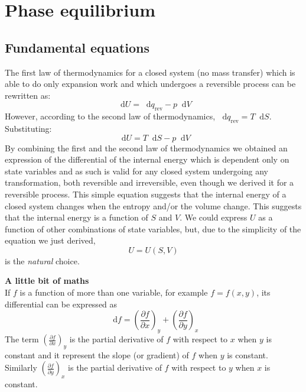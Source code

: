 \documentclass[12pt,a4paper]{report}
\newcommand*\diff{\mathop{}\!\mathrm{d}}
\begin{document}
   \pagestyle{headings}
   \thispagestyle{plain}
   \newpage
   \noindent
   \begin{center}
   \end{center}
   \section*{Phase equilibrium}
   \subsection*{Fundamental equations}
   The first law of thermodynamics for a closed system (no mass transfer) which is able to do only expansion work and which undergoes a reversible process can be rewritten as:
   \begin{equation*}
   \diff U = \diff q_{\mathrm{rev}} -p \diff V
   \end{equation*}
   However, according to the second law of thermodynamics, $\diff q_{\mathrm{rev}}=T\diff S$. Substituting: 
   \begin{equation*}
   \diff U = T\diff S-p \diff V
   \end{equation*}
   By combining the first and the second law of thermodynamics we obtained an expression of the differential of the internal energy which is dependent only on state variables and as such is valid for any closed system undergoing any transformation, both reversible and irreversible, even though we derived it for a reversible process. This simple equation suggests that the internal energy of a closed system changes when the entropy and/or the volume change. This suggests that the internal energy is a function of $S$ and $V$. We could express $U$ as a function of other combinations of state variables, but, due to the simplicity of the equation we just derived,
   \begin{equation*}
   U=U(S,V)
   \end{equation*}
   is the \textit{natural} choice.
   \begin{mdframed}
   \textbf{A little bit of maths}\\
   If $f$ is a function of more than one variable, for example $f=f(x,y)$, its differential can be expressed as 
   \begin{equation*}
   \diff f = \left(\frac{\partial f}{\partial x}\right)_{y}+\left(\frac{\partial f}{\partial y}\right)_{x}
   \end{equation*}
   The term $\left(\frac{\partial f}{\partial x}\right)_{y}$ is the partial derivative of $f$ with respect to $x$ when $y$ is constant and it represent the slope (or gradient) of $f$ when $y$ is constant. Similarly $\left(\frac{\partial f}{\partial y}\right)_{x}$ is the partial derivative of $f$ with respect to $y$ when $x$ is constant.
   \end{mdframed}
\end{document}
